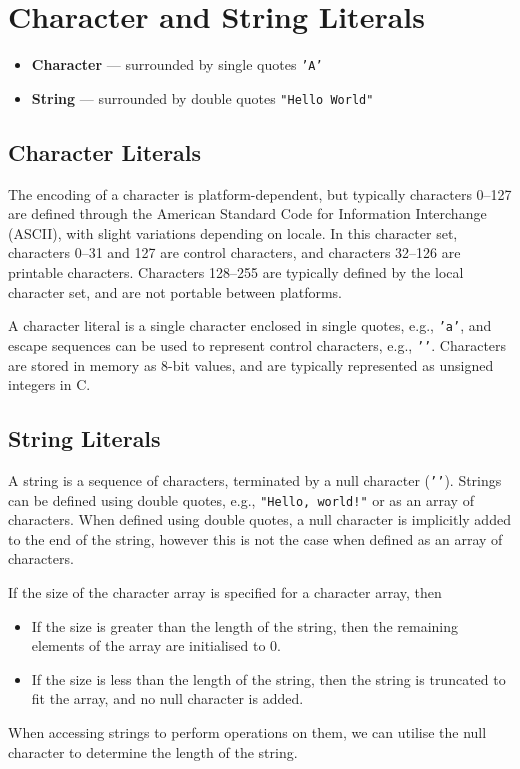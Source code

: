 \documentclass{report}
\begin{document}
\section{Character and String Literals}
\begin{itemize}
    \item \textbf{Character} --- surrounded by single quotes \texttt{'A'}
    \item \textbf{String} --- surrounded by double quotes \texttt{"Hello World"} %
\end{itemize}
\subsection{Character Literals}
The encoding of a character is platform-dependent, but typically characters 0--127 are defined through the American Standard Code for Information Interchange (ASCII),
with slight variations depending on locale. In this character set, characters 0--31 and 127 are control characters, and characters 32--126 are printable characters.
Characters 128--255 are typically defined by the local character set, and are not portable between platforms.

A character literal is a single character enclosed in single quotes, e.g., \texttt{'a'}, and escape sequences can be used to represent control characters, e.g., \texttt{'\n'}.
Characters are stored in memory as 8-bit values, and are typically represented as unsigned integers in C.
\subsection{String Literals}
A string is a sequence of characters, terminated by a null character (\texttt{'\0'}).
Strings can be defined using double quotes, e.g., \texttt{"Hello, world!"} or as an array of characters. When defined using double quotes, %
a null character is implicitly added to the end of the string, however this is not the case when defined as an array of characters.

If the size of the character array is specified for a character array, then
\begin{itemize}
    \item If the size is greater than the length of the string, then the remaining elements of the array are initialised to 0.
    \item If the size is less than the length of the string, then the string is truncated to fit the array, and no null character is added.
\end{itemize}
When accessing strings to perform operations on them, we can utilise the null character to determine the length of the string.
\end{document}
